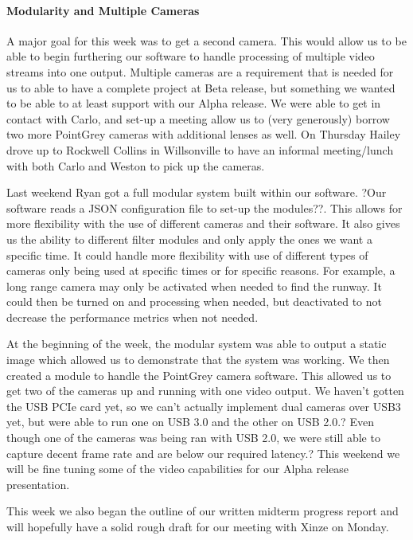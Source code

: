\paragraph{Modularity and Multiple Cameras}
A major goal for this week was to get a second camera. This would allow us to be able to begin furthering our software to handle processing of multiple video streams into one output. Multiple cameras are a requirement that is needed for us to able to have a complete project at Beta release, but something we wanted to be able to at least support with our Alpha release. We were able to get in contact with Carlo, and set-up a meeting allow us to (very generously) borrow two more PointGrey cameras with additional lenses as well. On Thursday Hailey drove up to Rockwell Collins in Willsonville to have an informal meeting/lunch with both Carlo and Weston to pick up the cameras.
\par
Last weekend Ryan got a full modular system built within our software. ?Our software reads a JSON configuration file to set-up the modules??. This allows for more flexibility with the use of different cameras and their software. It also gives us the ability to different filter modules and only apply the ones we want a specific time. It could handle more flexibility with use of different types of cameras only being used at specific times or for specific reasons. For example, a long range camera may only be activated when needed to find the runway. It could then be turned on and processing when needed, but deactivated to not decrease the performance metrics when not needed. 
\par
At the beginning of the week, the modular system was able to output a static image which allowed us to demonstrate that the system was working. We then created a module to handle the PointGrey camera software. This allowed us to get two of the cameras up and running with one video output. We haven't gotten the USB PCIe card yet, so we can't actually implement dual cameras over USB3 yet, but were able to run one on USB 3.0 and the other on USB 2.0.? Even though one of the cameras was being ran with USB 2.0, we were still able to capture decent frame rate and are below our required latency.? This weekend we will be fine tuning some of the video capabilities for our Alpha release presentation.
\par
This week we also began the outline of our written midterm progress report and will hopefully have a solid rough draft for our meeting with Xinze on Monday.\\

